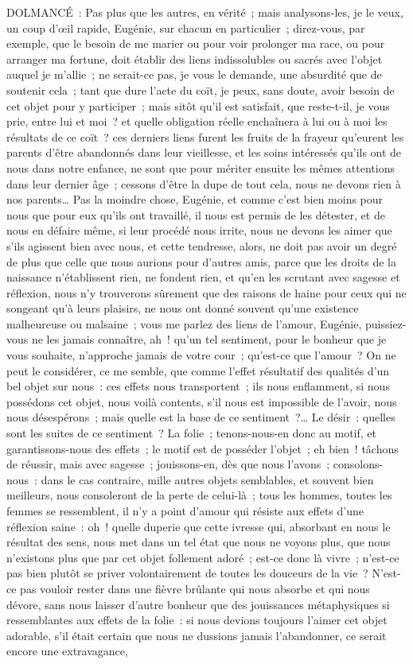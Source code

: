 \documentclass[french,twoside]{book} %
\begin{document}
DOLMANCÉ : Pas plus que les autres, en vérité ; mais analysons-les, je le veux, un coup d’œil rapide, Eugénie, sur chacun en particulier ; direz-vous, par exemple, que le besoin de me marier ou pour voir prolonger ma race, ou pour arranger ma fortune, doit établir des liens indissolubles ou sacrés avec l’objet auquel je m’allie ; ne serait-ce pas, je vous le demande, une absurdité que de soutenir cela ; tant que dure l’acte du coït, je peux, sans doute, avoir besoin de cet objet pour y participer ; mais sitôt qu’il est satisfait, que reste-t-il, je vous prie, entre lui et moi ? et quelle obligation réelle enchaînera à lui ou à moi les résultats de ce coït ? ces derniers liens furent les fruits de la frayeur qu’eurent les parents d’être abandonnés dans leur vieillesse, et les soins intéressés qu’ils ont de nous dans notre enfance, ne sont que pour mériter ensuite les mêmes attentions dans leur dernier âge ; cessons d’être la dupe de tout cela, nous ne devons rien à nos parents… Pas la moindre chose, Eugénie, et comme c’est bien moins pour nous que pour eux qu’ils ont travaillé, il nous est permis de les détester, et de nous en défaire même, si leur procédé nous irrite, nous ne devons les aimer que s’ils agissent bien avec nous, et cette tendresse, alors, ne doit pas avoir un degré de plus que celle que nous aurions pour d’autres amis, parce que les droits de la naissance n’établissent rien, ne fondent rien, et qu’en les scrutant avec sagesse et réflexion, nous n’y trouverons sûrement que des raisons de haine pour ceux qui ne songeant qu’à leurs plaisirs, ne nous ont donné souvent qu’une existence malheureuse ou malsaine ; vous me parlez des liens de l’amour, Eugénie, puissiez-vous ne les jamais connaître, ah ! qu’un tel sentiment, pour le bonheur que je vous souhaite, n’approche jamais de votre cour ; qu’est-ce que l’amour ? On ne peut le considérer, ce me semble, que comme l’effet résultatif des qualités d’un bel objet sur nous : ces effets nous transportent ; ils nous enflamment, si nous possédons cet objet, nous voilà contents, s’il nous est impossible de l’avoir, nous nous désespérons ; mais quelle est la base de ce sentiment ?… Le désir : quelles sont les suites de ce sentiment ? La folie ; tenons-nous-en donc au motif, et garantissons-nous des effets ; le motif est de posséder l’objet ; eh bien ! tâchons de réussir, mais avec sagesse ; jouissons-en, dès que nous l’avons ; consolons-nous : dans le cas contraire, mille autres objets semblables, et souvent bien meilleurs, nous consoleront de la perte de celui-là ; tous les hommes, toutes les femmes se ressemblent, il n’y a point d’amour qui résiste aux effets d’une réflexion saine : oh ! quelle duperie que cette ivresse qui, absorbant en nous le résultat des sens, nous met dans un tel état que nous ne voyons plus, que nous n’existons plus que par cet objet follement adoré ; est-ce donc là vivre ; n’est-ce pas bien plutôt se priver volontairement de toutes les douceurs de la vie ? N’est-ce pas vouloir rester dans une fièvre brûlante qui nous absorbe et qui nous dévore, sans nous laisser d’autre bonheur que des jouissances métaphysiques si ressemblantes aux effets de la folie : si nous devions toujours l’aimer cet objet adorable, s’il était certain que nous ne dussions jamais l’abandonner, ce serait encore une extravagance, 
\end{document}
